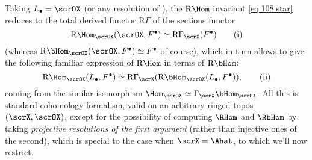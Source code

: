 Taking $L_\bullet=\scrOX$ (or any resolution of \scrOX), the $\mathrm
R\Hom$ invariant \eqref{eq:108.star} reduces to the total derived
functor $\mathrm R\Gamma$ of the sections functor
\begin{equation}
  \label{eq:108.i}
  \mathrm R\Hom_\scrOX(\scrOX,F^\bullet)\simeq\mathrm R\Gamma_\scrX(F^\bullet)\tag{i}
\end{equation}
(whereas $\mathrm R\bHom_\scrOX(\scrOX,F^\bullet)\simeq F^\bullet$ of
course), which in turn allows to give the following familiar
expression of $\mathrm R\Hom$ in terms of $\mathrm R\bHom$:
\begin{equation}
  \label{eq:108.ii}
  \mathrm R\Hom_\scrOX(L_\bullet,F^\bullet) \simeq \mathrm
  R\Gamma_\scrX(\mathrm R\bHom_\scrOX(L_\bullet,F^\bullet)),\tag{ii}
\end{equation}
coming from the similar isomorphism
$\Hom_\scrOX\simeq\Gamma_\scrX\bHom_\scrOX$. All this is standard
cohomology formalism, valid on an arbitrary ringed topos
$(\scrX,\scrOX)$, except for the possibility of computing $\RHom$ and
$\RbHom$ by taking \emph{projective resolutions of the first argument}
(rather than injective ones of the second), which is special to the
case when $\scrX=\Ahat$, to which we'll now restrict.

